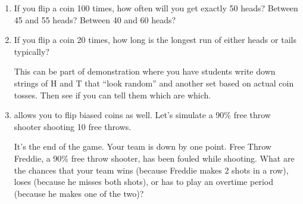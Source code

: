 \begin{enumerate}
\item If you flip a coin 100 times, how often will you get exactly 50 heads?
Between 45 and 55 heads?  Between 40 and 60 heads?
\item
If you flip a coin 20 times, how long is the longest run of either heads or tails typically?

This can be part of demonstration where you have students write down strings of H and T
that ``look random'' and another set based on actual coin tosses.  Then see if you can 
tell them which are which.

\item
{} allows you to flip biased coins as well.  Let's simulate a 90\%
free throw shooter shooting 10 free throws.
\begin{knitrout}
\end{knitrout}


It's the end of the game.  Your team is down by one point.  Free Throw Freddie,
a 90\% free throw shooter, has been fouled while shooting.  What are the chances 
that your team wins (because Freddie makes 2 shots in a row), loses (because he misses 
both shots), or has to play an overtime period (because he makes one of the two)?

\begin{knitrout}
\end{knitrout}



\end{enumerate}
